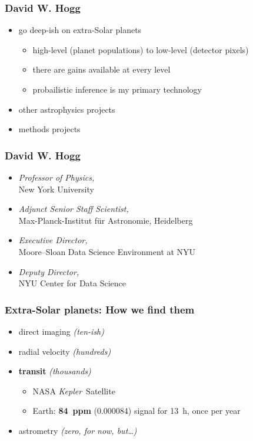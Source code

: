 \documentclass{beamer}
\renewcommand{\emph}[1]{\textbf{#1}}
\newcommand{\project}[1]{\textsl{#1}}
\newcommand{\Kepler}{\project{Kepler}}
\begin{document}
\begin{frame}
  \frametitle{David W. Hogg}
  \begin{itemize}
  \item go deep-ish on extra-Solar planets
    \begin{itemize}
    \item high-level (planet populations) to low-level (detector pixels)
    \item there are gains available at every level
    \item probailistic inference is my primary technology
    \end{itemize}
  \item other astrophysics projects
  \item methods projects
  \end{itemize}
\end{frame}

\begin{frame}
  \frametitle{David W. Hogg}
  \begin{itemize}
  \item \textsl{Professor of Physics,}\\ New York University
  \item \textsl{Adjunct Senior Staff Scientist,}\\ Max-Planck-Institut f\"ur Astronomie, Heidelberg
  \item \textsl{Executive Director,}\\ Moore--Sloan Data Science Environment at NYU
  \item \textsl{Deputy Director,}\\ NYU Center for Data Science
  \end{itemize}
\end{frame}

\begin{frame}
  \frametitle{Extra-Solar planets: How we find them}
  \begin{itemize}
  \item direct imaging \textit{(ten-ish)}
  \item radial velocity \textit{(hundreds)}
  \item \emph{transit} \textit{(thousands)}
    \begin{itemize}
    \item NASA \Kepler\ Satellite
    \item Earth: \emph{84~ppm} (0.000084) signal for 13~h, once per year
    \end{itemize}
  \item astrometry \textit{(zero, for now, but\ldots)}
  \end{itemize}
\end{frame}
\end{document}
